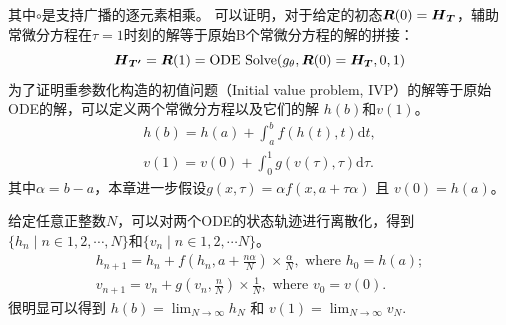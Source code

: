 其中$\circ$是支持广播的逐元素相乘。
可以证明，对于给定的初态$\boldsymbol R(0) = \boldsymbol{{H}}_{\boldsymbol{T}}$，辅助常微分方程在$\tau=1$时刻的解等于原始B个常微分方程的解的拼接：
\begin{equation}
    \boldsymbol{{H}}_{\boldsymbol{T'}}=\boldsymbol{R}(1)= \text{ODE Solve}(g_\theta, \boldsymbol{R}(0)=\boldsymbol{H}_{\boldsymbol{T}}, 0, 1)
    \label{equ:parallel_solver}
\end{equation}
为了证明重参数化构造的初值问题（Initial value problem, IVP）的解等于原始ODE的解，可以定义两个常微分方程以及它们的解 $h(b)$和$v(1)$。
\begin{equation}
    \begin{aligned}
        h(b) = h(a) + \int_{a}^{b} f(h(t), t)\text{d}t,\\
        v(1) = v(0) + \int_{0}^{1} g(v(\tau), \tau) \text{d}\tau.
    \end{aligned}
\end{equation}
其中$\alpha = b-a$，本章进一步假设$g(x, \tau)= {\alpha}f(x, a+\tau\alpha)$ 且 $v(0)=h(a)$。

给定任意正整数$N$，可以对两个ODE的状态轨迹进行离散化，得到$\{h_n\mid n\in{1,2,\cdots, N}\}$和$\{v_n\mid n\in{1,2,\cdots N}\}$。
\begin{equation}
    \begin{aligned}
    h_{n+1} = h_{n}+f(h_{n}, a+\frac{n\alpha}{N})\times \frac{\alpha}{N}, \text{ where } h_0=h(a);\\
    v_{n+1} = v_{n}+g(v_{n}, \frac{n}{N})\times \frac{1}{N}, \text{ where } v_0=v(0).
    \end{aligned}
\end{equation}
很明显可以得到 $h(b)=\lim_{N\to\infty}h_N$ 和 $v(1)=\lim_{N\to\infty}v_N$. 

